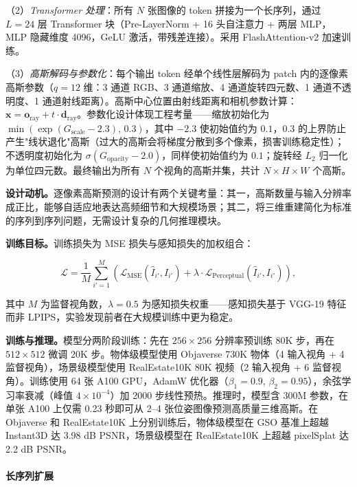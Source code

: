 （2）\textit{Transformer 处理}：所有 $N$ 张图像的 token 拼接为一个长序列，通过 $L=24$ 层 Transformer 块（Pre-LayerNorm + 16 头自注意力 + 两层 MLP，MLP 隐藏维度 4096，GeLU 激活，带残差连接）。采用 FlashAttention-v2 加速训练。

（3）\textit{高斯解码与参数化}：每个输出 token 经单个线性层解码为 patch 内的逐像素高斯参数（$q=12$ 维：3 通道 RGB、3 通道缩放、4 通道旋转四元数、1 通道不透明度、1 通道射线距离）。高斯中心位置由射线距离和相机参数计算：$\mathbf{x} = \mathbf{o}_{\mathrm{ray}} + t \cdot \mathbf{d}_{\mathrm{ray}}$。参数化设计体现工程考量——缩放初始化为 $\min(\exp(G_{\text{scale}} - 2.3),\, 0.3)$，其中 $-2.3$ 使初始值约为 $0.1$，$0.3$ 的上界防止产生"线状退化"高斯（过大的高斯会将梯度分散到多个像素，损害训练稳定性）；不透明度初始化为 $\sigma(G_{\text{opacity}} - 2.0)$，同样使初始值约为 $0.1$；旋转经 $L_2$ 归一化为单位四元数。最终输出为所有 $N$ 个视角的高斯并集，共计 $N \times H \times W$ 个高斯。

\textbf{设计动机。}逐像素高斯预测的设计有两个关键考量：其一，高斯数量与输入分辨率成正比，能够自适应地表达高频细节和大规模场景；其二，将三维重建简化为标准的序列到序列问题，无需设计复杂的几何推理模块。

\textbf{训练目标。}训练损失为 MSE 损失与感知损失的加权组合：

\begin{equation}
\mathcal{L} = \frac{1}{M} \sum_{i'=1}^{M} \left( \mathcal{L}_{\mathrm{MSE}}(\hat{I}_{i'}, I_{i'}) + \lambda \cdot \mathcal{L}_{\mathrm{Perceptual}}(\hat{I}_{i'}, I_{i'}) \right),
\end{equation}

其中 $M$ 为监督视角数，$\lambda=0.5$ 为感知损失权重——感知损失基于 VGG-19 特征而非 LPIPS，实验发现前者在大规模训练中更为稳定。

\textbf{训练与推理。}模型分两阶段训练：先在 $256\times 256$ 分辨率预训练 80K 步，再在 $512\times 512$ 微调 20K 步。物体级模型使用 Objaverse 730K 物体（4 输入视角 + 4 监督视角），场景级模型使用 RealEstate10K 80K 视频（2 输入视角 + 6 监督视角）。训练使用 64 张 A100 GPU，AdamW 优化器（$\beta_1=0.9$, $\beta_2=0.95$），余弦学习率衰减（峰值 $4\times 10^{-4}$）加 2000 步线性预热。推理时，模型含 300M 参数，在单张 A100 上仅需 0.23 秒即可从 2--4 张位姿图像预测高质量三维高斯。在 Objaverse 和 RealEstate10K 上分别训练后，物体级模型在 GSO 基准上超越 Instant3D 达 3.98 dB PSNR，场景级模型在 RealEstate10K 上超越 pixelSplat 达 2.2 dB PSNR。

\paragraph{长序列扩展}


